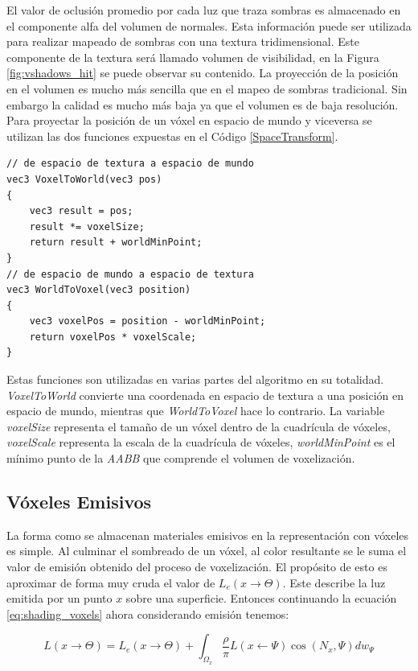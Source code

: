 El valor de oclusión promedio por cada luz que traza sombras es almacenado en el componente alfa del volumen de normales. Esta información puede ser utilizada para realizar mapeado de sombras con una textura tridimensional. Este componente de la textura será llamado volumen de visibilidad, en la Figura \ref{fig:vshadows_hit} se puede observar su contenido. La proyección de la posición en el volumen es mucho más sencilla que en el mapeo de sombras tradicional. Sin embargo la calidad es mucho más baja ya que el volumen es de baja resolución. Para proyectar la posición de un vóxel en espacio de mundo y viceversa se utilizan las dos funciones expuestas en el Código \ref{SpaceTransform}.
\\
\begin{lstlisting}[caption={Transformación de espacio entre coordenadas de textura y posiciones de mundo.}, label=SpaceTransform]
// de espacio de textura a espacio de mundo
vec3 VoxelToWorld(vec3 pos)
{
	vec3 result = pos;
	result *= voxelSize;
	return result + worldMinPoint;
}
// de espacio de mundo a espacio de textura
vec3 WorldToVoxel(vec3 position)
{
    vec3 voxelPos = position - worldMinPoint;
    return voxelPos * voxelScale;
}
\end{lstlisting}

Estas funciones son utilizadas en varias partes del algoritmo en su totalidad. \emph{VoxelToWorld} convierte una coordenada en espacio de textura a una posición en espacio de mundo, mientras que \emph{WorldToVoxel} hace lo contrario. La variable \emph{voxelSize} representa el tamaño de un vóxel dentro de la cuadrícula de vóxeles, \emph{voxelScale} representa la escala de la cuadrícula de vóxeles, \emph{worldMinPoint} es el mínimo punto de la \emph{AABB} que comprende el volumen de voxelización.

\subsection{Vóxeles Emisivos}
La forma como se almacenan materiales emisivos en la representación con vóxeles es simple. Al culminar el sombreado de un vóxel, al color resultante se le suma el valor de emisión obtenido del proceso de voxelización. El propósito de esto es aproximar de forma muy cruda el valor de $L_e(x\to\Theta)$. Este describe la luz emitida por un punto $x$ sobre una superficie. Entonces continuando la ecuación \ref{eq:shading_voxels} ahora considerando emisión tenemos:

\begin{equation}
		L(x\to\Theta) = L_e(x\to\Theta) + \int_{\Omega_{x}}{\frac{\rho}{\pi}L(x\gets\Psi)\cos(N_{x}, \Psi)dw_{\Psi}}
\end{equation}

